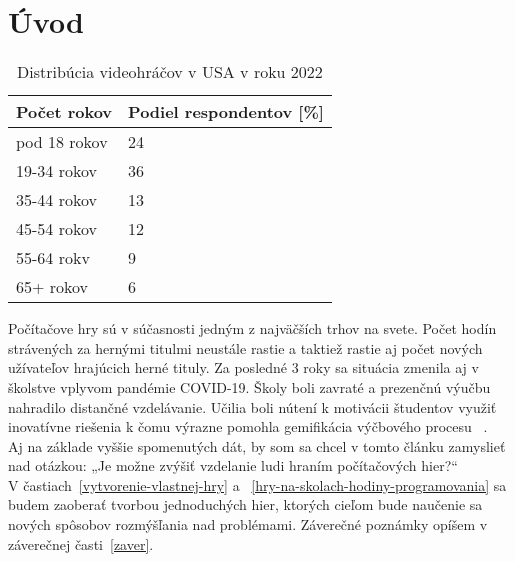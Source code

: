 \section{Úvod}
\begin{table}[!ht]
  \caption{Distribúcia videohráčov v USA v roku 2022}
   \centering
   \begin{tabular}{|l|l|}
   \hline
       Počet rokov & Podiel respondentov [\%] \\ \hline
       pod 18 rokov & 24 \\ \hline
       19-34 rokov & 36 \\ \hline
       35-44 rokov & 13 \\ \hline
       45-54 rokov & 12 \\ \hline
       55-64 rokv & 9 \\ \hline
       65+ rokov & 6 \\ \hline
   \end{tabular}
\end{table}
Počítačove hry sú v súčasnosti jedným z najväčších trhov na svete. Počet hodín strávených 
za hernými titulmi neustále rastie a taktiež rastie aj počet nových užívateľov hrajúcich 
herné tituly. Za posledné 3 roky sa situácia zmenila aj v školstve vplyvom pandémie COVID-19. Školy
boli zavraté a prezenčnú výučbu nahradilo distančné vzdelávanie. Učilia boli nútení k motivácii študentov využiť 
inovatívne riešenia k čomu výrazne pomohla gemifikácia výčbového procesu ~\cite{gemifikaciaPandemia, gemifikaciaNaSkole-1}.\\ 
Aj na základe vyššie spomenutých dát, by som sa chcel v tomto článku zamyslieť nad otázkou: 
„Je možne zvýšiť vzdelanie ludi hraním počítačových hier?“\\ 
V častiach~\ref{vytvorenie-vlastnej-hry} a ~\ref{hry-na-skolach-hodiny-programovania} sa budem zaoberať 
tvorbou jednoduchých hier, ktorých cieľom bude naučenie sa nových spôsobov rozmýšľania nad problémami.
Záverečné poznámky opíšem v záverečnej časti~\ref{zaver}.